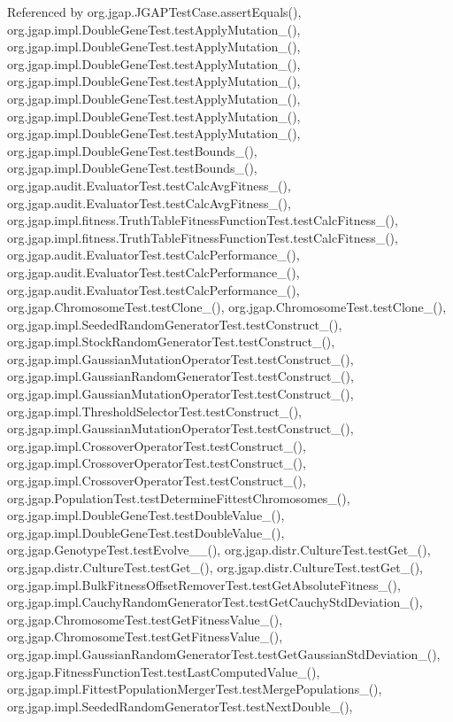 Referenced by org.\-jgap.\-J\-G\-A\-P\-Test\-Case.\-assert\-Equals(), org.\-jgap.\-impl.\-Double\-Gene\-Test.\-test\-Apply\-Mutation\-\_(), org.\-jgap.\-impl.\-Double\-Gene\-Test.\-test\-Apply\-Mutation\-\_(), org.\-jgap.\-impl.\-Double\-Gene\-Test.\-test\-Apply\-Mutation\-\_(), org.\-jgap.\-impl.\-Double\-Gene\-Test.\-test\-Apply\-Mutation\-\_(), org.\-jgap.\-impl.\-Double\-Gene\-Test.\-test\-Apply\-Mutation\-\_(), org.\-jgap.\-impl.\-Double\-Gene\-Test.\-test\-Apply\-Mutation\-\_(), org.\-jgap.\-impl.\-Double\-Gene\-Test.\-test\-Apply\-Mutation\-\_(), org.\-jgap.\-impl.\-Double\-Gene\-Test.\-test\-Bounds\-\_(), org.\-jgap.\-impl.\-Double\-Gene\-Test.\-test\-Bounds\-\_(), org.\-jgap.\-audit.\-Evaluator\-Test.\-test\-Calc\-Avg\-Fitness\-\_(), org.\-jgap.\-audit.\-Evaluator\-Test.\-test\-Calc\-Avg\-Fitness\-\_(), org.\-jgap.\-impl.\-fitness.\-Truth\-Table\-Fitness\-Function\-Test.\-test\-Calc\-Fitness\-\_(), org.\-jgap.\-impl.\-fitness.\-Truth\-Table\-Fitness\-Function\-Test.\-test\-Calc\-Fitness\-\_(), org.\-jgap.\-audit.\-Evaluator\-Test.\-test\-Calc\-Performance\-\_(), org.\-jgap.\-audit.\-Evaluator\-Test.\-test\-Calc\-Performance\-\_(), org.\-jgap.\-audit.\-Evaluator\-Test.\-test\-Calc\-Performance\-\_(), org.\-jgap.\-Chromosome\-Test.\-test\-Clone\-\_(), org.\-jgap.\-Chromosome\-Test.\-test\-Clone\-\_(), org.\-jgap.\-impl.\-Seeded\-Random\-Generator\-Test.\-test\-Construct\-\_(), org.\-jgap.\-impl.\-Stock\-Random\-Generator\-Test.\-test\-Construct\-\_(), org.\-jgap.\-impl.\-Gaussian\-Mutation\-Operator\-Test.\-test\-Construct\-\_(), org.\-jgap.\-impl.\-Gaussian\-Random\-Generator\-Test.\-test\-Construct\-\_(), org.\-jgap.\-impl.\-Gaussian\-Mutation\-Operator\-Test.\-test\-Construct\-\_(), org.\-jgap.\-impl.\-Threshold\-Selector\-Test.\-test\-Construct\-\_(), org.\-jgap.\-impl.\-Gaussian\-Mutation\-Operator\-Test.\-test\-Construct\-\_(), org.\-jgap.\-impl.\-Crossover\-Operator\-Test.\-test\-Construct\-\_(), org.\-jgap.\-impl.\-Crossover\-Operator\-Test.\-test\-Construct\-\_(), org.\-jgap.\-impl.\-Crossover\-Operator\-Test.\-test\-Construct\-\_(), org.\-jgap.\-Population\-Test.\-test\-Determine\-Fittest\-Chromosomes\-\_(), org.\-jgap.\-impl.\-Double\-Gene\-Test.\-test\-Double\-Value\-\_(), org.\-jgap.\-impl.\-Double\-Gene\-Test.\-test\-Double\-Value\-\_(), org.\-jgap.\-Genotype\-Test.\-test\-Evolve\-\_\-\_(), org.\-jgap.\-distr.\-Culture\-Test.\-test\-Get\-\_(), org.\-jgap.\-distr.\-Culture\-Test.\-test\-Get\-\_(), org.\-jgap.\-distr.\-Culture\-Test.\-test\-Get\-\_(), org.\-jgap.\-impl.\-Bulk\-Fitness\-Offset\-Remover\-Test.\-test\-Get\-Absolute\-Fitness\-\_(), org.\-jgap.\-impl.\-Cauchy\-Random\-Generator\-Test.\-test\-Get\-Cauchy\-Std\-Deviation\-\_(), org.\-jgap.\-Chromosome\-Test.\-test\-Get\-Fitness\-Value\-\_(), org.\-jgap.\-Chromosome\-Test.\-test\-Get\-Fitness\-Value\-\_(), org.\-jgap.\-impl.\-Gaussian\-Random\-Generator\-Test.\-test\-Get\-Gaussian\-Std\-Deviation\-\_(), org.\-jgap.\-Fitness\-Function\-Test.\-test\-Last\-Computed\-Value\-\_(), org.\-jgap.\-impl.\-Fittest\-Population\-Merger\-Test.\-test\-Merge\-Populations\-\_(), org.\-jgap.\-impl.\-Seeded\-Random\-Generator\-Test.\-test\-Next\-Double\-\_(), 